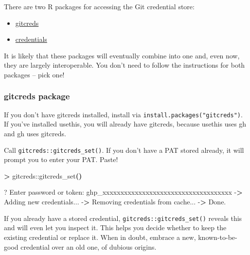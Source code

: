 \documentclass[
]{book}
\newenvironment{Shaded}{\begin{snugshade}}{\end{snugshade}}
\newcommand{\ExtensionTok}[1]{#1}
\newcommand{\KeywordTok}[1]{\textcolor[rgb]{0.13,0.29,0.53}{\textbf{#1}}}
\newcommand{\NormalTok}[1]{#1}
\newcommand{\OperatorTok}[1]{\textcolor[rgb]{0.81,0.36,0.00}{\textbf{#1}}}
\providecommand{\tightlist}{%
  \setlength{\itemsep}{0pt}\setlength{\parskip}{0pt}}
\begin{document}
There are two R packages for accessing the Git credential store:

\begin{itemize}
\tightlist
\item
  \href{https://r-lib.github.io/gitcreds/}{gitcreds}
\item
  \href{https://docs.ropensci.org/credentials/}{credentials}
\end{itemize}

It is likely that these packages will eventually combine into one and, even now, they are largely interoperable.
You don't need to follow the instructions for both packages -- pick one!

\subsubsection{gitcreds package}\label{gitcreds-package}

If you don't have gitcreds installed, install via \texttt{install.packages("gitcreds")}.
If you've installed usethis, you will already have gitcreds, because usethis uses gh and gh uses gitcreds.

Call \texttt{gitcreds::gitcreds\_set()}.
If you don't have a PAT stored already, it will prompt you to enter your PAT. Paste!

\begin{Shaded}
\begin{Highlighting}[]
\OperatorTok{\textgreater{}}\NormalTok{ gitcreds::gitcreds\_set}\KeywordTok{()}

\ExtensionTok{?}\NormalTok{ Enter password or token: ghp\_xxxxxxxxxxxxxxxxxxxxxxxxxxxxxxxxxxxx}
\ExtensionTok{{-}}\OperatorTok{\textgreater{}}\NormalTok{ Adding new credentials...}
\ExtensionTok{{-}}\OperatorTok{\textgreater{}}\NormalTok{ Removing credentials from cache...}
\ExtensionTok{{-}}\OperatorTok{\textgreater{}}\NormalTok{ Done.}
\end{Highlighting}
\end{Shaded}

If you already have a stored credential, \texttt{gitcreds::gitcreds\_set()} reveals this and will even let you inspect it.
This helps you decide whether to keep the existing credential or replace it.
When in doubt, embrace a new, known-to-be-good credential over an old one, of dubious origins.
\end{document}
